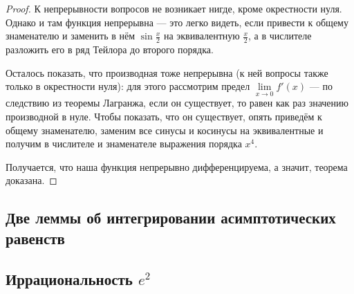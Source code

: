 \begin{proof}
	К непрерывности вопросов не возникает нигде, кроме окрестности нуля. Однако и там функция непрерывна --- это легко видеть, если привести к общему знаменателю и заменить в нём \(\sin \frac{x}{2}\) на эквивалентную \(\frac{x}{2}\), а в числителе разложить его в ряд Тейлора до второго порядка.
	
	Осталось показать, что производная тоже непрерывна (к ней вопросы также только в окрестности нуля): для этого рассмотрим предел \(\lim\limits_{x \to 0} f'(x)\) --- по следствию из теоремы Лагранжа, если он существует, то равен как раз значению производной в нуле. Чтобы показать, что он существует, опять приведём к общему знаменателю, заменим все синусы и косинусы на эквивалентные и получим в числителе и знаменателе выражения порядка \(x^4\).
	
	Получается, что наша функция непрерывно дифференцируема, а значит, теорема доказана.
\end{proof}

\subsection{\color{red} Две леммы об интегрировании асимптотических равенств}

\subsection{\color{red} Иррациональность \(e^2\)}

%

